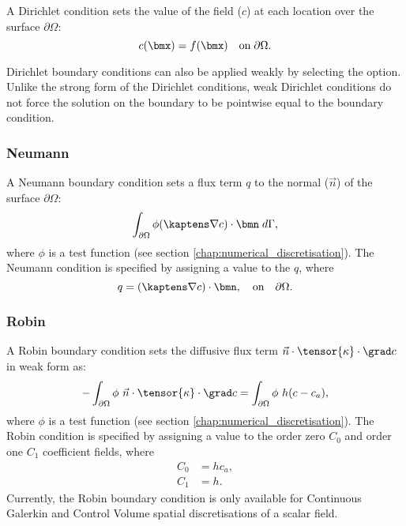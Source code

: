 A Dirichlet condition sets the value of the field ($c$) at each location over the surface $\partial\Omega$:
\begin{equation*}
c(\bmx) = f(\bmx) \quad \textrm{on}\; \partial\Omega.
\end{equation*}

Dirichlet boundary conditions can also be applied weakly by selecting the 
option. Unlike the strong form of the Dirichlet conditions, weak Dirichlet
conditions do not force the solution on the boundary to be pointwise equal
to the boundary condition. 

\subsubsection{Neumann}

A Neumann boundary condition sets a flux term $q$ to the normal ($\vec n$) of the surface $\partial\Omega$:
\begin{equation*}
\int_{\partial\Omega} \phi (\kaptens\nabla c)\cdot\bmn \;d\Gamma,
\end{equation*}
where $\phi$ is a test function (see section \ref{chap:numerical_discretisation}).
The Neumann condition is specified by assigning a value to the $q$, where
\begin{equation*}
q = (\kaptens\nabla c)\cdot\bmn,\quad \textrm{on}\quad \partial\Omega.
\end{equation*}

\subsubsection{Robin}

A Robin boundary condition sets the diffusive flux term  $\vec{n}\cdot\tensor{\kappa}\cdot\grad c$ in weak form as:
\begin{equation*}
- \int_{\partial\Omega} \phi~\vec{n}\cdot\tensor{\kappa}\cdot\grad c =
    \int_{\partial\Omega} \phi~h(c-c_{a}),
\end{equation*}
where $\phi$ is a test function (see section \ref{chap:numerical_discretisation}).
The Robin condition is specified by assigning a value to the order zero $C_{0}$ and order one $C_{1}$ coefficient fields, where
\begin{align}
   C_{0} &= hc_{a}, \\
   C_{1} &= h.
\end{align}
Currently, the Robin boundary condition is only available for Continuous Galerkin and Control Volume 
spatial discretisations of a scalar field. 

